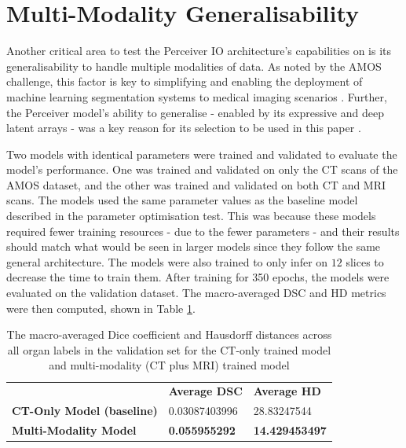\documentclass{l4proj}
\begin{document}
\section{Multi-Modality Generalisability} \label{sec:eval_multi_modality}

Another critical area to test the Perceiver IO architecture’s capabilities on is its generalisability to handle multiple modalities of data. As noted by the AMOS challenge, this factor is key to simplifying and enabling the deployment of machine learning segmentation systems to medical imaging scenarios \citep{ji2022amos}. Further, the Perceiver model’s ability to generalise - enabled by its expressive and deep latent arrays - was a key reason for its selection to be used in this paper \citep{choi2022semantic}.

Two models with identical parameters were trained and validated to evaluate the model’s performance. One was trained and validated on only the CT scans of the AMOS dataset, and the other was trained and validated on both CT and MRI scans. The models used the same parameter values as the baseline model described in the parameter optimisation test. This was because these models required fewer training resources - due to the fewer parameters - and their results should match what would be seen in larger models since they follow the same general architecture. The models were also trained to only infer on $12$ slices to decrease the time to train them. After training for 350 epochs, the models were evaluated on the validation dataset. The macro-averaged DSC and HD metrics were then computed, shown in Table \ref{tab:multi_modality_results}.

\begin{table}[]
\caption{The macro-averaged Dice coefficient and Hausdorff distances across all organ labels in the validation set for the CT-only trained model and multi-modality (CT plus MRI) trained model} \label{tab:multi_modality_results}
\begin{tabular}{lll}
\textbf{}                          & \textbf{Average DSC} & \textbf{Average HD} \\
\textbf{CT-Only Model (baseline)}            & \num{0.03087403996}                  & \num{28.83247544}                 \\
\textbf{Multi-Modality Model} & \textbf{\num{0.055955292}}                  & \textbf{\num{14.429453497}}                
\end{tabular}
\end{table}
\end{document}

